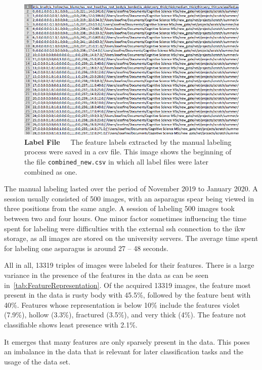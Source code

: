 \begin{figure}[!ht]
	\centering
	\includegraphics[scale=0.5]{Figures/chapter03/csv_overview.png}
	\decoRule
	\caption[Manual Labeling Output CSV-File]{\textbf{Label File}~~~The feature labels extracted by the manual labeling process were saved in a csv file. This image shows the beginning of the file \texttt{combined\_new.csv} in which all label files were later combined as one.}
	\label{fig:CSVfileOverview}
\end{figure}

\bigskip
The manual labeling lasted over the period of November 2019 to January 2020. A session usually consisted of 500 images, with an asparagus spear being viewed in three positions from the same angle. A session of labeling 500 images took between two and four hours. One minor factor sometimes influencing the time spent for labeling were difficulties with the external \acrshort{ssh} connection to the \acrshort{ikw} storage, as all images are stored on the university servers. The average time spent for labeling one asparagus is around 27 -- 48 seconds.

All in all, 13319 triples of images were labeled for their features. There is a large variance in the presence of the features in the data as can be seen in~\autoref{tab:FeatureRepresentation}. Of the acquired 13319 images, the feature most present in the data is rusty body with 45.5\%, followed by the feature bent with 40\%. Features whose representation is below 10\% include the features violet (7.9\%), hollow (3.3\%), fractured (3.5\%), and very thick (4\%). The feature not classifiable shows least presence with 2.1\%. 

It emerges that many features are only sparsely present in the data. This poses an imbalance in the data that is relevant for later classification tasks and the usage of the data set.

